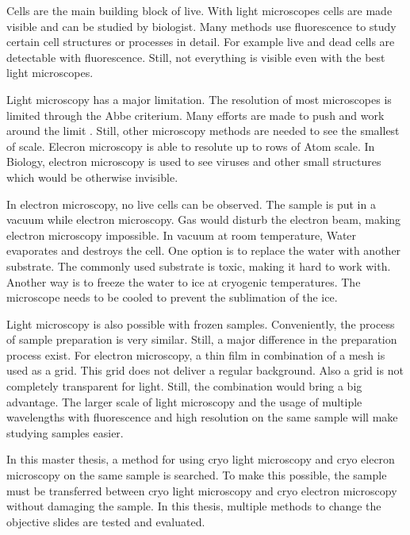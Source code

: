 

Cells are the main building block of live. With light microscopes cells are made visible and can be studied by biologist. Many methods use fluorescence to study certain cell structures or processes in detail. For example live and dead cells are detectable with fluorescence. Still, not everything is visible even with the best light microscopes.

Light microscopy has a major limitation. The resolution of most microscopes is limited through the Abbe criterium. Many efforts are made to push and work around the limit \cite{Heintzmann.2006}. Still, other microscopy methods are needed to see the smallest of scale. Elecron microscopy is able to resolute up to rows of Atom scale. In Biology, electron microscopy is used to see viruses and other small structures which would be otherwise invisible. 

In electron microscopy, no live cells can be observed. The sample is put in a vacuum while electron microscopy. Gas would disturb the electron beam, making electron microscopy impossible. In vacuum at room temperature, Water evaporates and destroys the cell. One option is to replace the water with another substrate. The commonly used substrate is toxic, making it hard to work with. Another way is to freeze the water to ice at cryogenic temperatures. The microscope needs to be cooled to prevent the sublimation of the ice.

Light microscopy is also possible with frozen samples. Conveniently, the process of sample preparation is very similar. Still, a major difference in the preparation process exist. For electron microscopy, a thin film in combination of a mesh is used as a grid. This grid does not deliver a regular background. Also a grid is not completely transparent for light. Still, the combination would bring a big advantage. The larger scale of light microscopy and the usage of multiple wavelengths with fluorescence and high resolution on the same sample will make studying samples easier.

In this master thesis, a method for using cryo light microscopy and cryo elecron microscopy on the same sample is searched. To make this possible, the sample must be transferred between cryo light microscopy and cryo electron microscopy without damaging the sample. In this thesis, multiple methods to change the objective slides are tested and evaluated.

